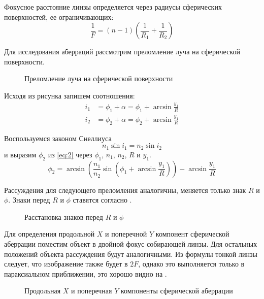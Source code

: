 \documentclass[a4paper, 12pt]{article}
\begin{document}
Фокусное расстояние линзы определяется через радиусы сферических
поверхностей, ее ограничивающих:
\begin{equation}
    \frac{1}{F} = (n-1) \left( \frac{1}{R_1}+ \frac{1}{R_2} \right) 
    \label{eq:1}
\end{equation}

Для исследования аберраций рассмотрим преломление луча на сферической
поверхности.
\begin{figure}[H]
    \def\svgscale{1.1}
    
    \caption{Преломление луча на сферической поверхности}
    \label{fig:2}
\end{figure}

Исходя из рисунка запишем соотношения:
\begin{equation}
    \begin{aligned}
        i_1 &= \phi_1+\alpha = \phi_1 + \arcsin \frac{y_1}{R}\\
        i_2 &= \phi_2+\alpha = \phi_2 + \arcsin \frac{y_1}{R}
    \end{aligned}
    \label{eq:2}
\end{equation}

Воспользуемся законом Снеллиуса
\begin{equation}
    n_1 \sin i_1 = n_2 \sin i_2
    \label{eq:3}
\end{equation}
и выразим $\phi_2$ из \eqref{eq:2} через $\phi_1$, $n_1$, $n_2$, $R$ и
$y_1$.
\begin{equation}
    \phi_2 = \arcsin \left( \frac{n_1}{n_2} \sin \left( \phi_1 +
    \arcsin \frac{y_1}{R} \right) \right) - \arcsin \frac{y_1}{R}
    \label{eq:4}
\end{equation}

Рассуждения для следующего преломления аналогичны, меняется только
знак $R$ и $\phi$. Знаки перед $R$ и $\phi$ ставятся согласно
.
\begin{figure}[H]
    \def\svgscale{0.8}
    
    \caption{Расстановка знаков перед $R$ и $\phi$}
    \label{fig:2a}
\end{figure}


Для определения продольной $X$ и поперечной $Y$ компонент сферической аберрации поместим
объект в двойной фокус собирающей линзы. Для остальных положений
объекта рассуждения будут аналогичными. Из формулы тонкой линзы
следует, что изображение также
будет в $2F$, однако это выполняется только в параксиальном
приближении, это хорошо видно на .
\begin{figure}[H]
    \def\svgscale{1.3}
    
    \caption{Продольная $X$ и поперечная $Y$ компоненты сферической аберрации}
    \label{fig:3}
\end{figure}
\end{document}
